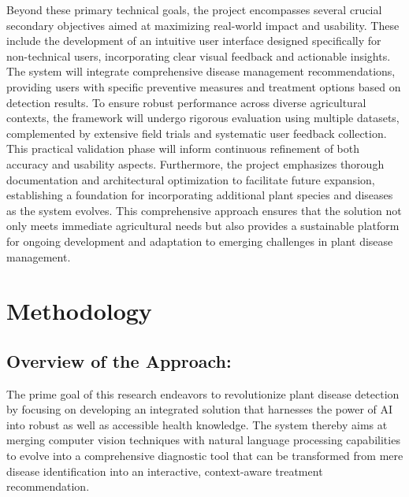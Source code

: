 Beyond these primary technical goals, the project encompasses several crucial secondary objectives aimed at maximizing real-world impact and usability. These include the development of an intuitive user interface designed specifically for non-technical users, incorporating clear visual feedback and actionable insights. The system will integrate comprehensive disease management recommendations, providing users with specific preventive measures and treatment options based on detection results. To ensure robust performance across diverse agricultural contexts, the framework will undergo rigorous evaluation using multiple datasets, complemented by extensive field trials and systematic user feedback collection. This practical validation phase will inform continuous refinement of both accuracy and usability aspects. Furthermore, the project emphasizes thorough documentation and architectural optimization to facilitate future expansion, establishing a foundation for incorporating additional plant species and diseases as the system evolves. This comprehensive approach ensures that the solution not only meets immediate agricultural needs but also provides a sustainable platform for ongoing development and adaptation to emerging challenges in plant disease management.

\section{ Methodology}



\subsection{Overview of the Approach:} 
The prime goal of this research endeavors to revolutionize plant disease detection by focusing on developing an integrated solution that harnesses the power of AI into robust as well as accessible health knowledge. The system thereby aims at merging computer vision techniques with natural language processing capabilities to evolve into a comprehensive diagnostic tool that can be transformed from mere disease identification into an interactive, context-aware treatment recommendation. 

\

